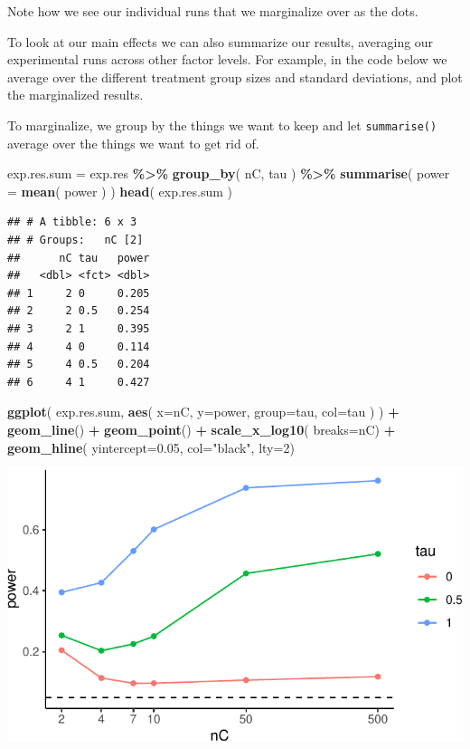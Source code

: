 \documentclass[
]{book}
\newenvironment{Shaded}{\begin{snugshade}}{\end{snugshade}}
\newcommand{\AttributeTok}[1]{\textcolor[rgb]{0.13,0.29,0.53}{#1}}
\newcommand{\DecValTok}[1]{\textcolor[rgb]{0.00,0.00,0.81}{#1}}
\newcommand{\FloatTok}[1]{\textcolor[rgb]{0.00,0.00,0.81}{#1}}
\newcommand{\FunctionTok}[1]{\textcolor[rgb]{0.13,0.29,0.53}{\textbf{#1}}}
\newcommand{\NormalTok}[1]{#1}
\newcommand{\OtherTok}[1]{\textcolor[rgb]{0.56,0.35,0.01}{#1}}
\newcommand{\SpecialCharTok}[1]{\textcolor[rgb]{0.81,0.36,0.00}{\textbf{#1}}}
\newcommand{\StringTok}[1]{\textcolor[rgb]{0.31,0.60,0.02}{#1}}
\begin{document}
Note how we see our individual runs that we marginalize over as the dots.

To look at our main effects we can also summarize our results, averaging our
experimental runs across other factor levels. For example, in the code below
we average over the different treatment group sizes and standard deviations,
and plot the marginalized results.

To marginalize, we group by the things we want to keep and let \texttt{summarise()}
average over the things we want to get rid of.

\begin{Shaded}
\begin{Highlighting}[]
\NormalTok{exp.res.sum }\OtherTok{=}\NormalTok{ exp.res }\SpecialCharTok{\%\textgreater{}\%} \FunctionTok{group\_by}\NormalTok{( nC, tau ) }\SpecialCharTok{\%\textgreater{}\%}
  \FunctionTok{summarise}\NormalTok{( }\AttributeTok{power =} \FunctionTok{mean}\NormalTok{( power ) )}
\FunctionTok{head}\NormalTok{( exp.res.sum )}
\end{Highlighting}
\end{Shaded}

\begin{verbatim}
## # A tibble: 6 x 3
## # Groups:   nC [2]
##      nC tau   power
##   <dbl> <fct> <dbl>
## 1     2 0     0.205
## 2     2 0.5   0.254
## 3     2 1     0.395
## 4     4 0     0.114
## 5     4 0.5   0.204
## 6     4 1     0.427
\end{verbatim}

\begin{Shaded}
\begin{Highlighting}[]
\FunctionTok{ggplot}\NormalTok{( exp.res.sum, }\FunctionTok{aes}\NormalTok{( }\AttributeTok{x=}\NormalTok{nC, }\AttributeTok{y=}\NormalTok{power, }\AttributeTok{group=}\NormalTok{tau, }\AttributeTok{col=}\NormalTok{tau ) ) }\SpecialCharTok{+}
  \FunctionTok{geom\_line}\NormalTok{() }\SpecialCharTok{+} \FunctionTok{geom\_point}\NormalTok{() }\SpecialCharTok{+}
  \FunctionTok{scale\_x\_log10}\NormalTok{( }\AttributeTok{breaks=}\NormalTok{nC) }\SpecialCharTok{+}
  \FunctionTok{geom\_hline}\NormalTok{( }\AttributeTok{yintercept=}\FloatTok{0.05}\NormalTok{, }\AttributeTok{col=}\StringTok{"black"}\NormalTok{, }\AttributeTok{lty=}\DecValTok{2}\NormalTok{)}
\end{Highlighting}
\end{Shaded}

\begin{center}\includegraphics[width=0.75\linewidth]{Designing-Simulations-in-R_files/figure-latex/plotCollapse-1} \end{center}
\end{document}
